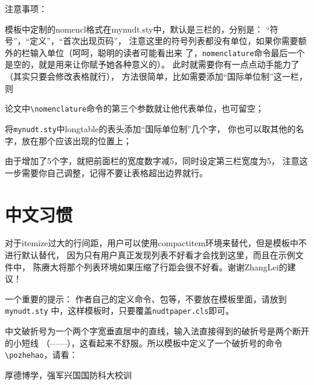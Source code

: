 {\hei 注意事项：}{\kai 模板中定制的nomencl格式在mynudt.sty中，默认是三栏的，分别是：
``符号''，``定义''，``首次出现页码''，
注意这里的符号列表都没有单位，如果你需要额外的栏输入单位（呵呵，聪明的读者可能看出来
了，\verb|nomenclature|命令最后一个是空的，就是用来让你赋予她各种意义的）。
此时就需要你有一点点动手能力了（其实只要会修改表格就行），
方法很简单，比如需要添加``国际单位制''这一栏，则
\begin{compactenum}
\item 论文中\verb|\nomenclature|命令的第三个参数就让他代表单位，也可留空；
\item 将\verb|mynudt.sty|中longtable的表头添加``国际单位制''几个字，
你也可以取其他的名字，放在那个{\kai 应该出现的}位置上；
\item 由于增加了5个字，就把前面栏的宽度数字减5，同时设定第三栏宽度为5，
注意这一步需要你自己调整，记得不要让表格超出边界就行。
\end{compactenum}
}

\section{中文习惯}
\label{sec:chinese}

对于itemize过大的行间距，用户可以使用compactitem环境来替代，但是模板中不进行默认替代，
因为只有用户真正发现列表不好看才会找到这里，而且在示例文件中，
陈赓大将那个列表环境如果压缩了行距会很不好看。谢谢ZhangLei的建议！

{\hei 一个重要的提示：}
作者自己的定义命令、包等，不要放在模板里面，请放到\verb|mynudt.sty|
中，这样模板时，只要覆盖\verb|nudtpaper.cls|即可。

中文破折号为一个两个字宽垂直居中的直线，输入法直接得到的破折号是两个断开的小短线
（——），这看起来不舒服。所以模板中定义了一个破折号的命令 \verb|\pozhehao|，请看：

厚德博学，强军兴国\hfill \pozhehao{}国防科大校训

